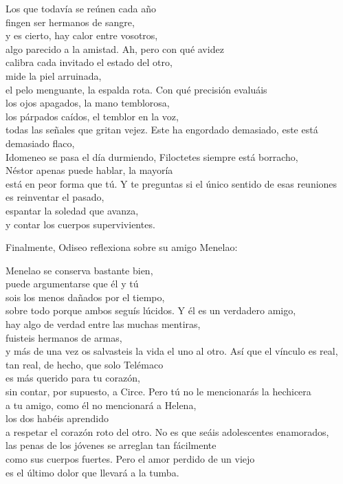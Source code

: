 \begin{versopropio}
Los que todavía se reúnen cada año\\
fingen ser hermanos de sangre,\\
y es cierto, hay calor entre vosotros,\\
algo parecido a la amistad.
\stanzabreak
Ah, pero con qué avidez\\
calibra cada invitado el estado del otro,\\
mide la piel arruinada,\\
el pelo menguante, la espalda rota.
\stanzabreak
Con qué precisión evaluáis\\
los ojos apagados, la mano temblorosa,\\
los párpados caídos, el temblor en la voz,\\
todas las señales que gritan vejez.
\stanzabreak
Este ha engordado demasiado, este está demasiado flaco,\\
Idomeneo se pasa el día durmiendo, Filoctetes siempre está borracho,\\
Néstor apenas puede hablar, la mayoría\\
está en peor forma que tú.
\stanzabreak
Y te preguntas si el único sentido de esas reuniones\\
es reinventar el pasado,\\
espantar la soledad que avanza,\\
y contar los cuerpos supervivientes.
\end{versopropio}

Finalmente, Odiseo reflexiona sobre su amigo Menelao:

\begin{versopropio}
Menelao se conserva bastante bien,\\
puede argumentarse que él y tú\\
sois los menos dañados por el tiempo,\\
sobre todo porque ambos seguís lúcidos.
\stanzabreak
Y él es un verdadero amigo,\\
hay algo de verdad entre las muchas mentiras,\\
fuisteis hermanos de armas,\\
y más de una vez os salvasteis la vida el uno al otro.
\stanzabreak
Así que el vínculo es real,\\
tan real, de hecho, que solo Telémaco\\
es más querido para tu corazón,\\
sin contar, por supuesto, a Circe.
\stanzabreak
Pero tú no le mencionarás la hechicera\\
a tu amigo, como él no mencionará a Helena,\\
los dos habéis aprendido\\
a respetar el corazón roto del otro.
\stanzabreak
No es que seáis adolescentes enamorados,\\
las penas de los jóvenes se arreglan tan fácilmente\\
como sus cuerpos fuertes. Pero el amor perdido de un viejo\\
es el último dolor que llevará a la tumba.
\end{versopropio}

